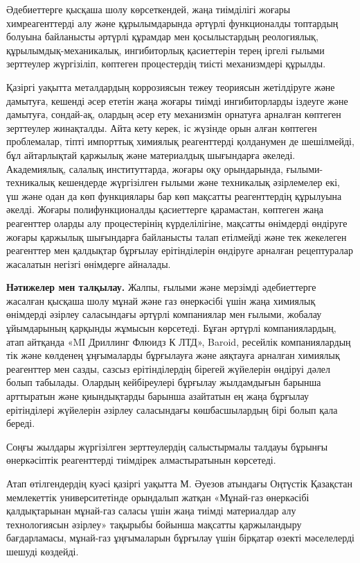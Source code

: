 \begin{multicols}{2}
Әдебиеттерге қысқаша шолу көрсеткендей, жаңа тиімділігі жоғары
химреагенттерді алу және құрылымдарында әртүрлі функционалды топтардың
болуына байланысты әртүрлі құрамдар мен қосылыстардың реологиялық,
құрылымдық-механикалық, ингибиторлық қасиеттерін терең іргелі ғылыми
зерттеулер жүргізіліп, көптеген процестердің тиісті механизмдері
құрылды.

Қазіргі уақытта металдардың коррозиясын тежеу теориясын жетілдіруге және
дамытуға, кешенді әсер ететін жаңа жоғары тиімді ингибиторларды іздеуге
және дамытуға, сондай-ақ, олардың әсер ету механизмін орнатуға арналған
көптеген зерттеулер жинақталды. Айта кету керек, іс жүзінде орын алған
көптеген проблемалар, тіпті импорттық химиялық реагенттерді қолданумен
де шешілмейді, бұл айтарлықтай қаржылық және материалдық шығындарға
әкеледі. Академиялық, салалық институттарда, жоғары оқу орындарында,
ғылыми-техникалық кешендерде жүргізілген ғылыми және техникалық
әзірлемелер екі, үш және одан да көп функциялары бар көп мақсатты
реагенттердің құрылуына әкелді. Жоғары полифункционалды қасиеттерге
қарамастан, көптеген жаңа реагенттер оларды алу процестерінің
күрделілігіне, мақсатты өнімдерді өндіруге жоғары қаржылық шығындарға
байланысты талап етілмейді және тек жекелеген реагенттер мен қалдықтар
бұрғылау ерітінділерін өндіруге арналған рецептуралар жасалатын негізгі
өнімдерге айналады.

{\bfseries Нәтижелер мен талқылау.} Жалпы, ғылыми және мерзімді
әдебиеттерге жасалған қысқаша шолу мұнай және газ өнеркәсібі үшін жаңа
химиялық өнімдерді әзірлеу саласындағы әртүрлі компаниялар мен ғылыми,
жобалау ұйымдарының қарқынды жұмысын көрсетеді. Бұған әртүрлі
компаниялардың, атап айтқанда «MI Дриллинг Флюидз К ЛТД», Baroid,
ресейлік компаниялардың тік және көлденең ұңғымаларды бұрғылауға және
аяқтауға арналған химиялық реагенттер мен сазды, сазсыз ерітінділердің
бірегей жүйелерін өндіруі дәлел болып табылады. Олардың кейбіреулері
бұрғылау жылдамдығын барынша арттыратын және қиындықтарды барынша
азайтатын ең жаңа бұрғылау ерітінділері жүйелерін әзірлеу саласындағы
көшбасшылардың бірі болып қала береді.

Соңғы жылдары жүргізілген зерттеулердің салыстырмалы талдауы бұрынғы
өнеркәсіптік реагенттерді тиімдірек алмастыратынын көрсетеді.

Атап өтілгендердің куәсі қазіргі уақытта М. Әуезов атындағы Оңтүстік
Қазақстан мемлекеттік университетінде орындалып жатқан «Мұнай-газ
өнеркәсібі қалдықтарынан мұнай-газ саласы үшін жаңа тиімді материалдар
алу технологиясын әзірлеу» тақырыбы бойынша мақсатты қаржыландыру
бағдарламасы, мұнай-газ ұңғымаларын бұрғылау үшін бірқатар өзекті
мәселелерді шешуді көздейді.


\end{multicols}
